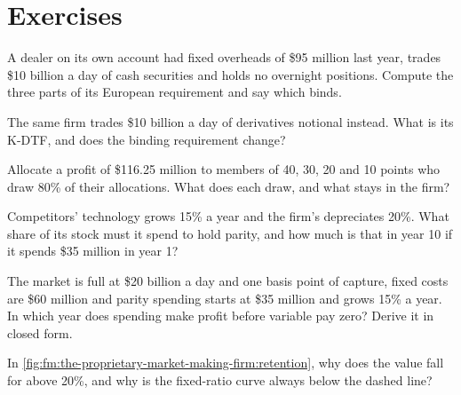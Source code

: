 \section{Exercises}

\begin{exercise}[$\star$]\label{exo:fm:the-proprietary-market-making-firm:1}
A dealer on its own account had fixed overheads of \$95 million last year, trades \$10 billion a day of cash securities and holds no overnight
positions. Compute the three parts of its European  requirement and say which binds.
\end{exercise}

\begin{exercise}[$\star$]\label{exo:fm:the-proprietary-market-making-firm:2}
The same firm trades \$10 billion a day of derivatives notional instead. What is its K-DTF, and does the binding requirement change?
\end{exercise}

\begin{exercise}[$\star$]\label{exo:fm:the-proprietary-market-making-firm:3}
Allocate a profit of \$116.25 million to members of 40, 30, 20 and 10 points who draw 80\% of their allocations. What does each draw, and what
stays in the firm?
\end{exercise}

\begin{exercise}[$\star\star$]\label{exo:fm:the-proprietary-market-making-firm:4}
Competitors' technology grows 15\% a year and the firm's depreciates 20\%. What share of its stock must it spend to hold parity, and how much is
that in year 10 if it spends \$35 million in year 1?
\end{exercise}

\begin{exercise}[$\star\star$]\label{exo:fm:the-proprietary-market-making-firm:5}
The market is full at \$20 billion a day and one basis point of capture, fixed costs are \$60 million and parity spending starts at \$35 million
and grows 15\% a year. In which year does spending make profit before variable pay zero? Derive it in closed form.
\end{exercise}

\begin{exercise}[$\star\star$]\label{exo:fm:the-proprietary-market-making-firm:6}
In \cref{fig:fm:the-proprietary-market-making-firm:retention}, why does the value fall for  above 20\%, and why is the fixed-ratio
curve always below the dashed line?
\end{exercise}

